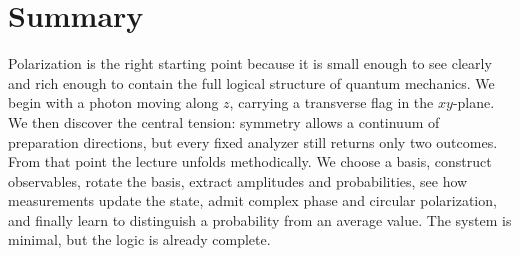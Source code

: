 \section{Summary}

Polarization is the right starting point because it is small enough to see clearly and rich enough to contain the full logical structure of quantum mechanics. We begin with a photon moving along \(z\), carrying a transverse flag in the \(xy\)-plane. We then discover the central tension: symmetry allows a continuum of preparation directions, but every fixed analyzer still returns only two outcomes. From that point the lecture unfolds methodically. We choose a basis, construct observables, rotate the basis, extract amplitudes and probabilities, see how measurements update the state, admit complex phase and circular polarization, and finally learn to distinguish a probability from an average value. The system is minimal, but the logic is already complete.